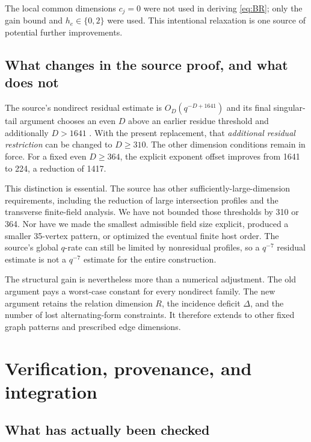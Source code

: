 \documentclass[11pt]{article}
\theoremstyle{definition}
\theoremstyle{remark}
\newcommand{\1}{\mathbf 1}
\newcommand{\src}[1]{\texttt{\detokenize{#1}}}
\begin{document}
The local common dimensions $c_j=0$ were not used in deriving
\eqref{eq:BR}; only the gain bound and $h_e\in\{0,2\}$ were used.
This intentional relaxation is one source of potential further improvements.

\subsection{What changes in the source proof, and what does not}

The source's nondirect residual estimate is $O_D(q^{-D+1641})$ and its final
singular-tail argument chooses an even $D$ above an earlier residue threshold
and additionally $D>1641$ \cite[\src{prop:singular-tail}]{OpenAISidorenko}.
With the present replacement, that \emph{additional residual restriction} can
be changed to $D\ge310$. The other dimension conditions remain in force.
For a fixed even $D\ge364$, the explicit exponent offset improves from 1641
to 224, a reduction of 1417.

This distinction is essential. The source has other sufficiently-large-dimension
requirements, including the reduction of large intersection profiles and the
transverse finite-field analysis. We have not bounded those thresholds by 310
or 364. Nor have we made the smallest admissible field size explicit, produced
a smaller 35-vertex pattern, or optimized the eventual finite host order.
The source's global $q$-rate can still be limited by nonresidual profiles, so a
$q^{-7}$ residual estimate is not a $q^{-7}$ estimate for the entire construction.

The structural gain is nevertheless more than a numerical adjustment. The old
argument pays a worst-case constant for every nondirect family. The new argument
retains the relation dimension $R$, the incidence deficit $\Delta$, and the
number of lost alternating-form constraints. It therefore extends to other
fixed graph patterns and prescribed edge dimensions.

\section{Verification, provenance, and integration}
\label{sec:verification}

\subsection{What has actually been checked}
\end{document}

